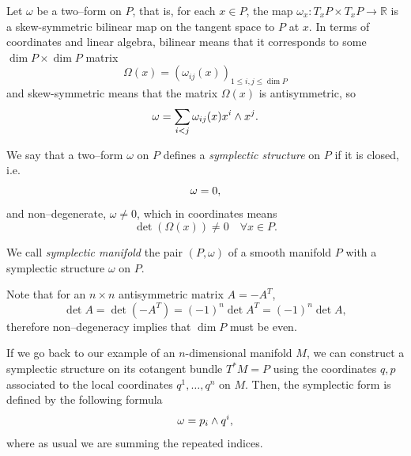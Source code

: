 \documentclass[english,fontsize=11pt,paper=a5,oneside]{scrbook}
\newcommand{\R}{\mathbb{R}}
\let\d\relax
\newcommand{\d}{\mathrm{d}}
\theoremstyle{definition}
\newenvironment{remark}
  {\pushQED{\qed}\renewcommand{\qedsymbol}{$\lozenge$}\remarkx}
  {\popQED\endremarkx}
\begin{document}
Let $\omega$ be a two--form on $P$, that is, for each $x\in P$, the map $\omega_x: T_x P \times T_x P \to \R$ is a skew-symmetric bilinear map on the tangent space to $P$ at $x$. In terms of coordinates and linear algebra, bilinear means that it corresponds to some $\dim P\times \dim P$ matrix
\begin{equation}
  \Omega(x) = \left(\omega_{ij}(x)\right)_{1\leq i,j\leq \dim P}
\end{equation}
and skew-symmetric means that the matrix $\Omega(x)$ is antisymmetric, so
\begin{equation}
  \omega = \sum_{i<j} \omega_{ij}(x) \d x^i\wedge \d x^j.
\end{equation}

\begin{tcolorbox}
  We say that a two--form $\omega$ on $P$ defines a \emph{symplectic structure} on $P$ if it is closed, i.e.
  \begin{equation}
    \d\omega = 0,
  \end{equation}
  and non--degenerate, $\omega \neq 0$, which in coordinates means
  \begin{equation}
    \det (\Omega(x)) \neq 0 \quad \forall x\in P.
  \end{equation}

  We call \emph{symplectic manifold} the pair $(P, \omega)$ of a smooth manifold $P$ with a symplectic structure $\omega$ on $P$.
\end{tcolorbox}

\begin{remark}
  Note that for an $n\times n$ antisymmetric matrix $A = - A^T$,
  \begin{equation}
    \det A = \det (-A^T) = (-1)^n \det A^T =  (-1)^n \det A,
  \end{equation}
  therefore non--degeneracy implies that $\dim P$ must be even.
\end{remark}

If we go back to our example of an $n$-dimensional manifold $M$, we can construct a symplectic structure on its cotangent bundle $T^*M = P$ using the coordinates $q,p$ associated to the local coordinates $q^1, \ldots, q^n$ on $M$.
Then, the symplectic form is defined by the following formula
\begin{equation}\label{eq:canonical2form}
  \omega = \d p_i \wedge \d q^i,
\end{equation}
where as usual we are summing the repeated indices.
\end{document}
